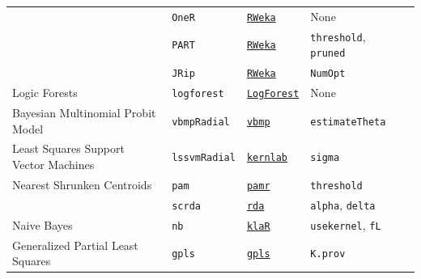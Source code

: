 \documentclass[12pt]{article}
\newcommand{\code}[1]{\mbox{\footnotesize\color{darkblue}\texttt{#1}}}
\begin{document}
\begin{landscape}
\begin{longtable}{lllll}
\rowcolor[rgb]{.95, .95, .95}               
       &
         \code{OneR} & 
           {\tt \href{http://cran.r-project.org/web/packages/RWeka/index.html}{RWeka}}   & 
            None  & \\  
        
\rowcolor[rgb]{.95, .95, .95}               
       &
         \code{PART} & 
           {\tt \href{http://cran.r-project.org/web/packages/RWeka/index.html}{RWeka}}   & 
            \code{threshold}, \code{pruned} &  \\  
            
\rowcolor[rgb]{.95, .95, .95}               
        &
         \code{JRip} & 
           {\tt \href{http://cran.r-project.org/web/packages/RWeka/index.html}{RWeka}}    & 
            \code{NumOpt}   & \\

      Logic Forests &
         \code{logforest} & 
           {\tt \href{http://cran.r-project.org/web/packages/LogForest/index.html}{LogForest}}   & 
            None & \\  

\rowcolor[rgb]{.95, .95, .95}               
      Bayesian Multinomial Probit Model  
      & \code{vbmpRadial} 
      &  {\tt \href{http://cran.r-project.org/web/packages/vbmp/index.html}{vbmp}} 
      & \code{estimateTheta} & \\
    
      Least Squares Support Vector Machines &
         \code{lssvmRadial} & 
             {\tt \href{http://cran.r-project.org/web/packages/kernlab/index.html}{kernlab}}      & 
            \code{sigma} & \\             
       
\rowcolor[rgb]{.95, .95, .95}         
      Nearest Shrunken Centroids&
         \code{pam} & 
             {\tt \href{http://cran.r-project.org/web/packages/pamr/index.html}{pamr}}        & 
            \code{threshold} & \\  
\rowcolor[rgb]{.95, .95, .95}   
&
         \code{scrda} & 
             {\tt \href{http://cran.r-project.org/web/packages/rda/index.html}{rda}}        & 
            \code{alpha}, \code{delta} & \\              
       

      Naive Bayes &
         \code{nb} & 
            {\tt \href{http://cran.r-project.org/web/packages/klaR/index.html}{klaR}}     & 
            \code{usekernel}, \code{fL} & \\

\rowcolor[rgb]{.95, .95, .95}   
      Generalized Partial Least Squares&
         \code{gpls} & 
             {\tt \href{http://cran.r-project.org/web/packages/gpls/index.html}{gpls}}      & 
            \code{K.prov} & \\
            

\end{longtable}
\end{landscape}
\end{document}
